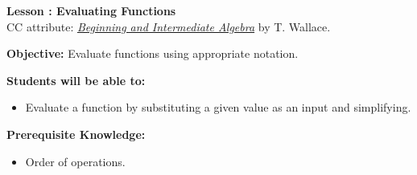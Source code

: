 \documentclass[12pt]{article}
\theoremstyle{definition}
\begin{document}
{\bf \large Lesson : Evaluating Functions}
\\ CC attribute: \href{http://www.wallace.ccfaculty.org/book/book.html}{\it{Beginning and Intermediate Algebra}} by T. Wallace. 
\hfill \doclicenseImage[imagewidth=5em]\\
\par
{\bf Objective:} Evaluate functions using appropriate notation.\\
\par
{\bf Students will be able to:}
\begin{itemize}
	\item Evaluate a function by substituting a given value as an input and simplifying.
\end{itemize}
{\bf Prerequisite Knowledge:}
\begin{itemize}
	\item Order of operations.
\end{itemize}
\hrulefill
\end{document}
